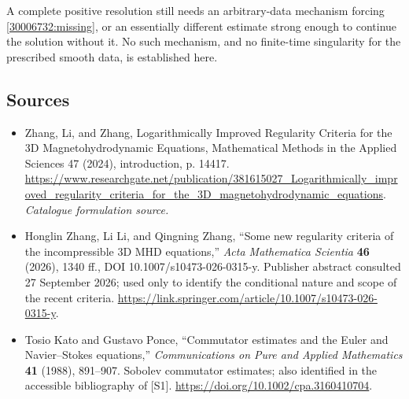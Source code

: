 \documentclass[11pt,a4paper]{article}
\numberwithin{equation}{section}
\begin{document}
A complete positive resolution still needs an arbitrary-data mechanism
forcing \eqref{30006732:missing}, or an essentially different estimate strong
enough to continue the solution without it. No such mechanism, and no
finite-time singularity for the prescribed smooth data, is established here.
\subsection{Sources}
\begin{itemize}\raggedright
\item[\textnormal{[S1]}]\hypertarget{source:30006732:1}{} Zhang, Li, and Zhang, Logarithmically Improved Regularity Criteria for the 3D Magnetohydrodynamic Equations, Mathematical Methods in the Applied Sciences 47 (2024), introduction, p. 14417.
\url{https://www.researchgate.net/publication/381615027_Logarithmically_improved_regularity_criteria_for_the_3D_magnetohydrodynamic_equations}.
{\small\textit{Catalogue formulation source.}}
\item[\textnormal{[E1]}]\hypertarget{extra:30006732:1}{}
Honglin Zhang, Li Li, and Qingning Zhang, ``Some new regularity criteria
of the incompressible 3D MHD equations,'' \emph{Acta Mathematica Scientia}
\textbf{46} (2026), 1340 ff., DOI 10.1007/s10473-026-0315-y.
Publisher abstract consulted 27 September 2026; used only to identify the
conditional nature and scope of the recent criteria.
\url{https://link.springer.com/article/10.1007/s10473-026-0315-y}.
\item[\textnormal{[E2]}]\hypertarget{extra:30006732:2}{}
Tosio Kato and Gustavo Ponce, ``Commutator estimates and the Euler and
Navier--Stokes equations,'' \emph{Communications on Pure and Applied
Mathematics} \textbf{41} (1988), 891--907. Sobolev commutator estimates;
also identified in the accessible bibliography of [S1].
\url{https://doi.org/10.1002/cpa.3160410704}.
\end{itemize}
\end{document}
